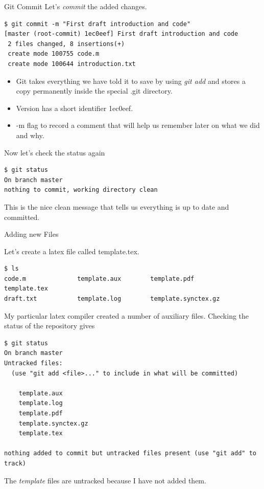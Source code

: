 \documentclass[10pt]{beamer}
\begin{document}
\begin{frame}[fragile]{Git Commit}
Let's \emph{commit} the added changes.
\begin{lstlisting}
$ git commit -m "First draft introduction and code"
[master (root-commit) 1ec0eef] First draft introduction and code
 2 files changed, 8 insertions(+)
 create mode 100755 code.m
 create mode 100644 introduction.txt
\end{lstlisting}
\begin{itemize}
\item
Git takes everything we have told it to save by using \emph{git add} and stores a copy permanently inside the special .git directory.
\item
Version has a short identifier 1ec0eef.
\item
 -m flag to record a comment that will help us remember later on what we did and why.
\end{itemize}
Now let's check the status again
\begin{lstlisting}
$ git status
On branch master
nothing to commit, working directory clean
\end{lstlisting}
This is the nice clean message that tells us everything is up to date and committed.

\end{frame}

\begin{frame}[fragile]{Adding new Files}

Let's create a latex file called template.tex.
\begin{lstlisting}
$ ls
code.m              template.aux        template.pdf        template.tex
draft.txt           template.log        template.synctex.gz
\end{lstlisting}
My particular latex compiler created a number of auxiliary files. Checking the status of the repository gives
\begin{lstlisting}
$ git status
On branch master
Untracked files:
  (use "git add <file>..." to include in what will be committed)

	template.aux
	template.log
	template.pdf
	template.synctex.gz
	template.tex

nothing added to commit but untracked files present (use "git add" to track)
\end{lstlisting}
The \emph{template} files are untracked because I have not added them.

\end{frame}
\end{document}
